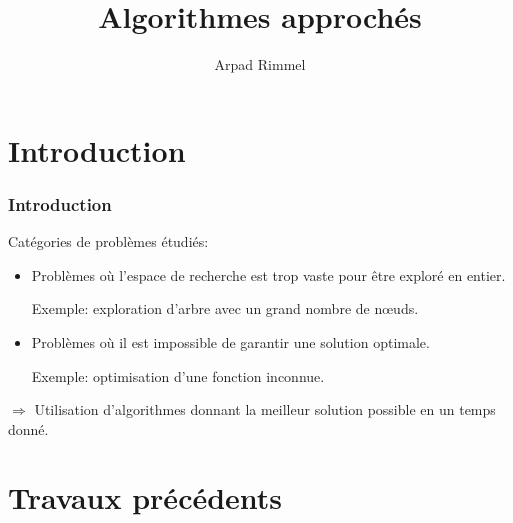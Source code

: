\documentclass{beamer}
\begin{document}
\title{Algorithmes approchés}

\author{Arpad Rimmel}


\begin{frame}
    \titlepage
\end{frame}


\section{Introduction}


\begin{frame}
    \frametitle{Introduction}
    
    Catégories de problèmes étudiés:
    \begin{itemize}
        \item Problèmes où l'espace de recherche est trop vaste pour être exploré en entier.

        Exemple: exploration d'arbre avec un grand nombre de nœuds.

        \item Problèmes où il est impossible de garantir une solution optimale.

        Exemple: optimisation d'une fonction inconnue.
    \end{itemize}

    $\Rightarrow$ Utilisation d'algorithmes donnant la meilleur solution possible en un temps donné.

\end{frame}


\section{Travaux précédents}
\end{document}
